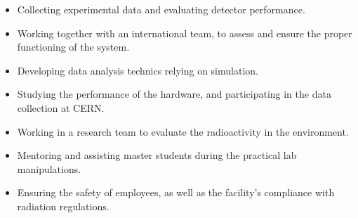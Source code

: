 \documentclass[12pt,a4paper,roman]{moderncv}
\begin{document}
{
    \begin{itemize}
        \item Collecting experimental data and evaluating detector performance.
        \item Working together with an international team, to assess and ensure the proper functioning of the system.
    \end{itemize}
} %

{
    \begin{itemize}
        \item Developing data analysis technics relying on simulation.
        \item Studying the performance of the hardware, and participating in the data collection at CERN.
    \end{itemize}
} %


{
    \begin{itemize}
        \item Working in a research team to evaluate the radioactivity in the environment.
        \item Mentoring and assisting master students during the practical lab manipulations.
        \item Ensuring the safety of employees, as well as the facility’s compliance with radiation regulations.
    \end{itemize}
} %

\end{document}
